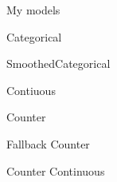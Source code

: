 \chap My models

\sec Categorical

\secc SmoothedCategorical

\sec Contiuous

\sec Counter

\sec Fallback Counter

\sec Counter Continuous